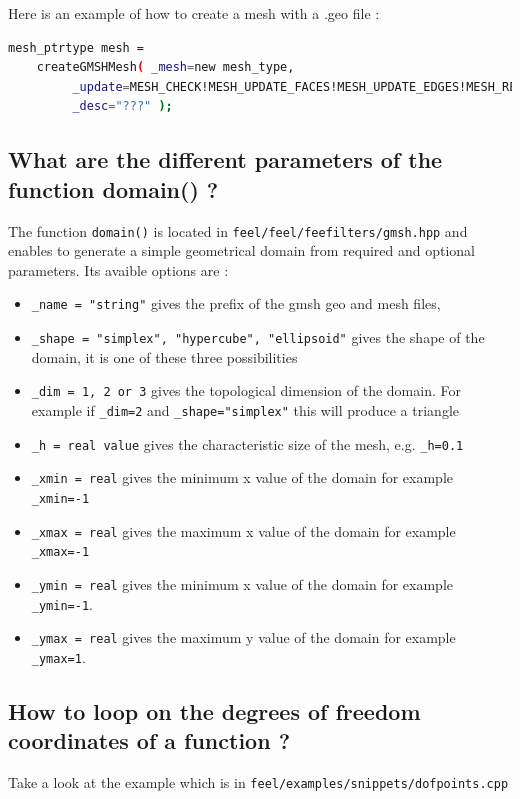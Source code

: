 Here is an example of how to create a mesh with a .geo file :
\begin{lstlisting}[language=sh]
 mesh_ptrtype mesh = 
	createGMSHMesh( _mesh=new mesh_type,
         _update=MESH_CHECK!MESH_UPDATE_FACES!MESH_UPDATE_EDGES!MESH_RENUMBER,
         _desc="???" );
\end{lstlisting}


\subsection{What are the different parameters of the function domain() ?}
The function \lstinline!domain()! is located in \lstinline!feel/feel/feefilters/gmsh.hpp! and enables to generate a simple geometrical domain from required and optional parameters. Its avaible options are :
\begin{itemize}
\item \lstinline!_name = "string"! gives the prefix of the gmsh geo and mesh files,
\item \lstinline!_shape = "simplex", "hypercube", "ellipsoid"! gives the shape of the domain, it is one of these three possibilities
\item \lstinline!_dim = 1, 2 or 3! gives the topological dimension of the domain. For example if \lstinline!_dim=2! and \lstinline!_shape="simplex"! this will produce a triangle
\item \lstinline!_h = real value! gives the characteristic size of the mesh, e.g. \lstinline!_h=0.1!
\item \lstinline!_xmin = real! gives the minimum x value of the domain for example \lstinline!_xmin=-1!
\item \lstinline!_xmax = real! gives the maximum x value of the domain for example \lstinline!_xmax=-1!
\item \lstinline!_ymin = real! gives the minimum x value of the domain for example \lstinline!_ymin=-1!.
\item \lstinline!_ymax = real!  gives the maximum y value of the domain for example \lstinline!_ymax=1!.

\end{itemize}


\subsection{How to loop on the degrees of freedom coordinates of a function ?}

Take a look at the example which is in \lstinline!feel/examples/snippets/dofpoints.cpp! 

